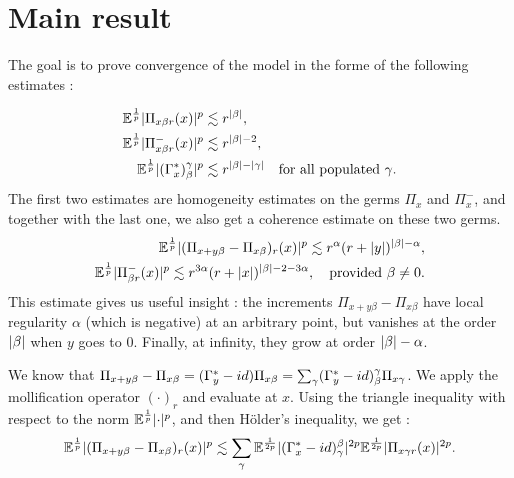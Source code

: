\section{Main result}
The goal is to prove convergence of the model in the forme of the following estimates :

\begin{align}
    \mathbb{E}^{\frac{1}{p}} \lvert\Pi_{x\beta r}(x)\rvert^p & \lesssim r ^{\lvert\beta\rvert}, \label{eq:estimate_Pix} \\
    \mathbb{E}^{\frac{1}{p}} \lvert\Pi^{-}_{x\beta r}(x)\rvert^p & \lesssim r ^{\lvert\beta\rvert-2}, \label{eq:estimate_Pi-x} \\
    \mathbb{E}^{\frac{1}{p}} \lvert(\Gamma^*_x)_\beta^\gamma\rvert^p & \lesssim r ^{\lvert\beta\rvert- \lvert\gamma\rvert} \quad \text{for all populated }\gamma. \label{eq:estimate_Gx}
\end{align}
The first two estimates are homogeneity estimates on the germs $\Pi_x$ and $\Pi_x^-$, and together with the last one, we also get a coherence estimate on these two germs.
\begin{align}
    \mathbb{E}^{\frac{1}{p}} \lvert(\Pi_{x+y\beta} - \Pi_{x\beta})_r(x)\rvert^p \lesssim r^{\alpha}(r+\lvert y\rvert)^{\lvert\beta\rvert-\alpha}, \label{eq:estimate_Pi} \\
    \mathbb{E}^{\frac{1}{p}} \lvert\Pi^-_{\beta r}(x)\rvert^p \lesssim r^{3\alpha}(r+\lvert x\rvert)^{\lvert\beta\rvert-2-3\alpha}, \quad \text{provided } \beta \neq 0.
\end{align}
This estimate gives us useful insight : the increments $\Pi_{x+y\beta} - \Pi_{x\beta}$ have local regularity $\alpha$ (which is negative) at an arbitrary point, but vanishes at the order $\lvert\beta\rvert$ when $y$ goes to $0$. Finally, at infinity, they grow at order $\lvert\beta\rvert-\alpha$.

We know that $\Pi_{x+y\beta} - \Pi_{x\beta} =(\Gamma^*_y - id) \Pi_{x\beta} = \sum_{\gamma} (\Gamma^*_y - id)^{\gamma}_{\beta} \Pi_{x\gamma}$. We apply the mollification operator $(\cdot)_r$ and evaluate at $x$. Using the triangle inequality with respect to the norm $\mathbb{E}^{\frac{1}{p}} \lvert\cdot\rvert^p$, and then Hölder's inequality, we get :
\begin{equation}
    \mathbb{E}^{\frac{1}{p}} \lvert(\Pi_{x+y\beta}-\Pi_{x\beta})_r(x)\rvert^p \lesssim \sum_{\gamma} \mathbb{E}^{\frac{1}{2p}} \lvert(\Gamma^*_{x}-id)_{\gamma}^{\beta}\rvert^{2p} \mathbb{E}^{\frac{1}{2p}} \lvert\Pi_{x\gamma r}(x)\rvert^{2p}.
\end{equation}

